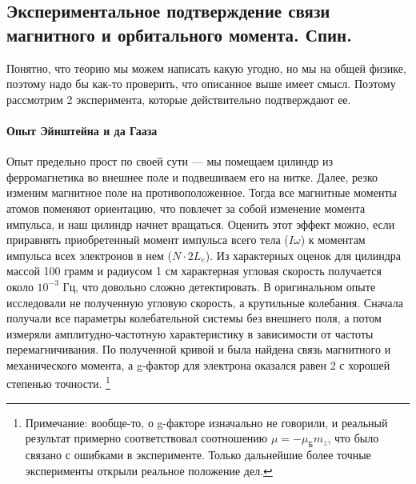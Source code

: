 \documentclass[12pt]{article}
\begin{document}
\subsection{Экспериментальное подтверждение связи магнитного и орбитального момента. Спин.}
Понятно, что теорию мы можем написать какую угодно, но мы на общей физике, поэтому надо бы как-то проверить, что описанное выше имеет смысл. Поэтому рассмотрим 2 эксперимента, которые действительно подтверждают ее.
\paragraph{Опыт Эйнштейна и да Гааза}
Опыт предельно прост по своей сути --- мы помещаем цилиндр из ферромагнетика во внешнее поле и подвешиваем его на нитке. Далее, резко изменим магнитное поле на противоположенное.
Тогда все магнитные моменты атомов поменяют ориентацию, что повлечет за собой изменение момента импульса, и наш цилиндр начнет вращаться. Оценить этот эффект можно, если приравнять приобретенный момент импульса всего тела ($I\omega$) к моментам импульса всех электронов в нем ($N\cdot 2L_{e}$). Из характерных оценок для цилиндра массой 100 грамм и радиусом 1 см характерная угловая скорость получается около $10^{-3}$ Гц, что довольно сложно детектировать. В оригинальном опыте исследовали не полученную угловую скорость, а крутильные колебания. Сначала получали все параметры колебательной системы без внешнего поля, а потом измеряли амплитудно-частотную характеристику в зависимости от частоты перемагничивания. По полученной кривой и была найдена связь магнитного и механического момента, а g-фактор для электрона оказался равен 2 с хорошей степенью точности.
\footnote{Примечание: вообще-то, о g-факторе изначально не говорили, и реальный результат примерно соответствовал соотношению $\mu = - \mu_{\text{Б}} m_z$, что было связано с ошибками в эксперименте. Только дальнейшие более точные эксперименты открыли реальное положение дел.}
\end{document}
